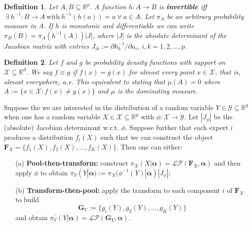 \documentclass[a4paper, notitlepage, 10pt]{article}
\newtheorem{definition}{Definition}[]
\begin{document}
\begin{definition}
Let $A, B \subseteq \mathbb{R}^p$.
A function  $h: A \to B$ is \textbf{invertible} iff $\: \exists \: h^{-1}: B \to A \: \text{with} \: h^{-1}(h(a)) = a \: \forall \: a \in A$. 
Let $\pi_A$ be an arbitrary probability measure in A. 
If $h$ is monotonic and differentiable we can write $\pi_B(B) = \pi_A(h^{-1}(A))|J|$, where $|J|$ is the absolute determinant of the Jacobian matrix with entries $J_{ik} := \partial h_k^{-1}/\partial a_i$, $i,k = 1, 2, \ldots, p$.
\end{definition}

\begin{definition}
 Let $f$ and $g$ be probability density functions with support on $\mathcal{X} \subseteq \mathbb{R}^d$.
 We say $f \equiv g$ if $f(x) = g(x)$ for almost every point $x \in \mathcal{X}$, that is, \textit{almost everywhere, a.e.}
 This equivalent to stating that $\mu(A) = 0$ where $A := \{ x \in \mathcal{X} : f(x) \neq g(x) \}$ and $\mu$ is the dominating measure.
\end{definition}


Suppose the we are interested in the distribution of a random variable $Y \in \mathcal{Y}\subseteq \mathbb{R}^q$  when one has a random variable $X \in \mathcal{X} \subseteq \mathbb{R}^p$ with $\phi : \mathcal{X} \to \mathcal{Y}$.
Let $|J_\phi|$ be the (absolute) Jacobian determinant w.r.t. $\phi$.
Suppose further that each expert $i$ produces a distribution $f_i(X)$ such that we can construct the object $\mathbf{F}_X = \{f_1(X), f_2(X), \ldots, f_K(X) \}$.
Then one can either:
\begin{itemize}
 \item[(a)] \textbf{Pool-then-transform:} construct $\pi_X(X | \boldsymbol \alpha) = \mathcal{LP}(\mathbf{F}_X, \boldsymbol \alpha)$ and then apply $\phi$ to obtain $\pi_Y(Y | \boldsymbol \alpha) := \pi_X( \phi^{-1}(Y)| \boldsymbol\alpha) |J_\phi|$;
 \item[(b)] \textbf{Transform-then-pool:} apply the transform to each component $i$ of $\mathbf{F}_X$ to build
 \[\mathbf{G}_{Y}:= \{g_i(Y), g_2(Y), \ldots, g_K(Y)\} \]
 and obtain $\pi_Y^{\prime}(Y |  \boldsymbol \alpha) = \mathcal{LP}(\mathbf{G}_{Y},  \boldsymbol \alpha)$.
\end{itemize}
\end{document}
